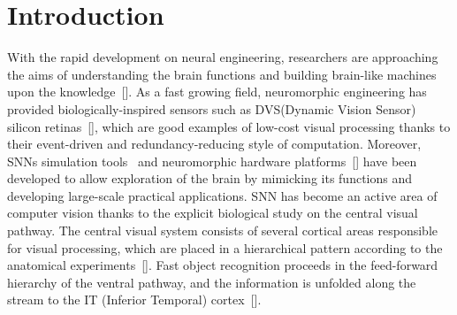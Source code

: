 \section{Introduction}
\label{sec:intro}
With the rapid development on neural engineering, researchers are approaching the aims of understanding the brain functions and building brain-like machines upon the knowledge~[\cite{furber2007neural}].
As a fast growing field, neuromorphic engineering has provided biologically-inspired sensors such as DVS(Dynamic Vision Sensor) silicon retinas~[\cite{serrano-gotarredona_128_2013, lichtsteiner2008128}], which are good examples of low-cost visual processing thanks to their event-driven and redundancy-reducing style of computation.
Moreover, SNNs simulation tools~\cite{davison2008pynn, gewaltig2007nest, goodman2008brian} and neuromorphic hardware platforms~[\cite{furber2013overview,  schemmel2010wafer, moradi2014event}] have been developed to allow exploration of the brain by mimicking its functions and developing large-scale practical applications.
SNN has become an active area of computer vision thanks to the explicit  biological study on the central visual pathway.
The central visual system consists of several cortical areas responsible for visual processing, which are placed in a hierarchical pattern according to the anatomical experiments~[\cite{felleman1991distributed}].
Fast object recognition proceeds in  the feed-forward hierarchy of the ventral pathway, and the information is unfolded along the stream to the  IT (Inferior Temporal) cortex~[\cite{dicarlo2012does}].

